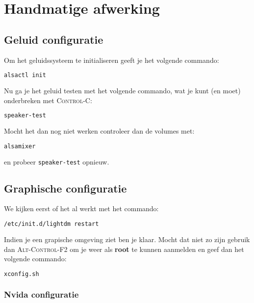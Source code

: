 \section{Handmatige afwerking}
\subsection{Geluid configuratie}

Om het geluidssysteem te initialiseren geeft je het volgende commando:

\begin{lstlisting}[language=bash]
alsactl init
\end{lstlisting}

Nu ga je het geluid testen met het volgende commando, wat je kunt (en moet) onderbreken met \textsc{Control-C}:

\begin{lstlisting}[language=bash]
speaker-test
\end{lstlisting}

Mocht het dan nog niet werken controleer dan de volumes met:

\begin{lstlisting}[language=bash]
alsamixer
\end{lstlisting}

en probeer \texttt{speaker-test} opnieuw.


\subsection{Graphische configuratie}

We kijken eerst of het al werkt met het commando:

\begin{lstlisting}[language=bash]
/etc/init.d/lightdm restart
\end{lstlisting}

Indien je een grapische omgeving ziet ben je klaar. Mocht dat niet zo zijn gebruik dan \textsc{Alt-Control-F2} om je weer als \textbf{root} te kunnen aanmelden en geef dan het volgende commando:


\begin{lstlisting}[language=bash]
xconfig.sh
\end{lstlisting}

\subsubsection{Nvida configuratie}

